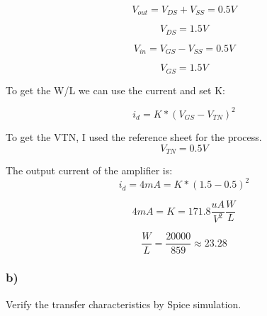 \documentclass[10pt,a4paper]{article}
\begin{document}
\begin{equation}
V_{out} = V_{DS} + V_{SS}  = 0.5 V
\end{equation}

\begin{equation}
V_{DS} = 1.5 V
\end{equation}

\begin{equation}
V_{in} = V_{GS} - V_{SS} = 0.5 V
\end{equation}

\begin{equation}
V_{GS} = 1.5 V
\end{equation}

To get the W/L we can use the current and set K:

\begin{equation}
i_{d} = K * (V_{GS} - V_{TN})^2
\end{equation}


To get the VTN, I used the reference sheet for the process. 
\begin{equation}
V_{TN} =  0.5V
\end{equation}


The output current of the amplifier is:
\begin{equation}
i_{d} = 4mA = K * (1.5 - 0.5)^2
\end{equation}

\begin{equation}
4mA = K =  171.8\frac{uA}{V^2}\frac{W}{L}
\end{equation}

\begin{equation}
\frac{W}{L} = \frac{20000}{859} \approx 23.28
\end{equation}



\subsubsection*{b)}
Verify the transfer characteristics by Spice simulation.\\
\end{document}
